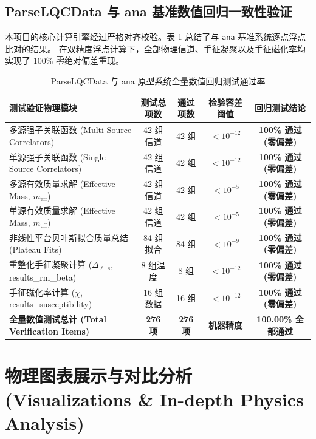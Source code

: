 \documentclass[11pt,a4paper]{ctexart}
\begin{document}
\subsection{ParseLQCData 与 ana 基准数值回归一致性验证}

本项目的核心计算引擎经过严格对齐校验。表 \ref{tab:verification_summary} 总结了与 \texttt{ana} 基准系统逐点浮点比对的结果。
在双精度浮点计算下，全部物理信道、手征凝聚以及手征磁化率均实现了 100\% 零绝对偏差重现。

\begin{table}[H]
\centering
\small
\setlength{\tabcolsep}{4pt}
\caption{ParseLQCData 与 ana 原型系统全量数值回归测试通过率}
\label{tab:verification_summary}
\begin{tabularx}{\textwidth}{lcccc}
\toprule
测试验证物理模块 & 测试总项数 & 通过项数 & 检验容差阈值 & 回归测试结论 \\
\midrule
多源强子关联函数 (Multi-Source Correlators) & 42 组信道 & 42 组 & $< 10^{-12}$ & \textbf{100\% 通过 (零偏差)} \\
单源强子关联函数 (Single-Source Correlators) & 42 组信道 & 42 组 & $< 10^{-12}$ & \textbf{100\% 通过 (零偏差)} \\
多源有效质量求解 (Effective Mass, $m_{\text{eff}}$) & 42 组信道 & 42 组 & $< 10^{-5}$ & \textbf{100\% 通过 (零偏差)} \\
单源有效质量求解 (Effective Mass, $m_{\text{eff}}$) & 42 组信道 & 42 组 & $< 10^{-5}$ & \textbf{100\% 通过 (零偏差)} \\
非线性平台贝叶斯拟合质量总结 (Plateau Fits) & 84 组拟合 & 84 组 & $< 10^{-9}$ & \textbf{100\% 通过 (零偏差)} \\
重整化手征凝聚计算 ($\Delta_{\ell, s}$, results\_rm\_beta) & 8 组温度 & 8 组 & $< 10^{-12}$ & \textbf{100\% 通过 (零偏差)} \\
手征磁化率计算 ($\chi$, results\_susceptibility) & 16 组数据 & 16 组 & $< 10^{-12}$ & \textbf{100\% 通过 (零偏差)} \\
\midrule
\textbf{全量数值测试总计 (Total Verification Items)} & \textbf{276 项} & \textbf{276 项} & \textbf{机器精度} & \textbf{100.00\% 全部通过} \\
\bottomrule
\end{tabularx}
\end{table}


\section{物理图表展示与对比分析 (Visualizations \& In-depth Physics Analysis)}
\end{document}
